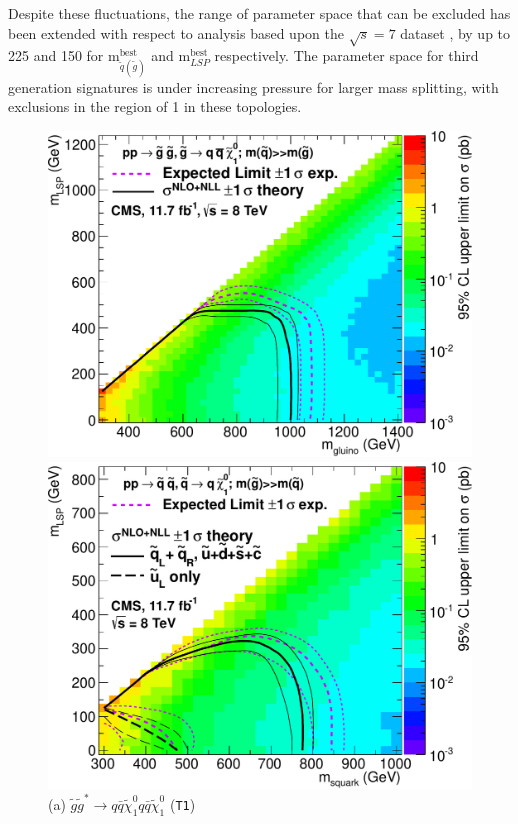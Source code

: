 Despite these fluctuations, the range of parameter space that can be excluded has been extended with respect to analysis based upon the $\sqrt{s} = 7$ \fb dataset \cite{Chatrchyan:2012wa}, by up to 225 and 150 \GeV for m$_{\tilde{q}(\tilde{g})}^{\text{best}}$ and m$_{LSP}^{\text{best}}$ respectively. The parameter space for third generation signatures is under increasing pressure for larger mass splitting, with exclusions in the region of 1 \TeV in these topologies. 

\begin{figure}[ht]
\footnotesize
\centering
\begin{minipage}[b]{0.48 \linewidth}
\includegraphics[width = 1.0\linewidth]{plots/t1.pdf}
\centering \caption*{(a) $\widetilde{g}\widetilde{g}^{*} \rightarrow q\bar{q}\widetilde{\chi}^{0}_{1}q\bar{q}\widetilde{\chi}^{0}_{1}$ (\texttt{T1})}\label{fig:t1}
\end{minipage}
\quad
\begin{minipage}[b]{0.48\linewidth}
\includegraphics[width = 1.0\linewidth]{plots/t2.pdf}

\end{minipage}
\end{figure}
